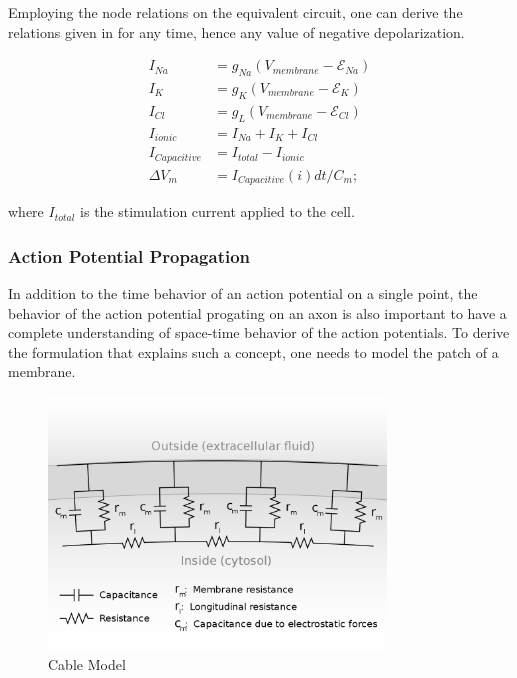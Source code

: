\documentclass{IEEEtran}
\begin{document}
Employing the node relations on the equivalent circuit, one can derive the relations given in  for any time, hence any value of negative depolarization.

\begin{align}
    I_{Na} &= g_{Na}(V_{membrane} - \mathcal{E}_{Na}) \label{eqn:node1}\\
    I_{K} &= g_{K}(V_{membrane} - \mathcal{E}_{K}) \label{eqn:node2}\\
    I_{Cl} &= g_{L}(V_{membrane} - \mathcal{E}_{Cl}) \label{eqn:node3}\\
    I_{ionic} &= I_{Na} + I_{K} + I_{Cl} \label{eqn:kirch1}\\
    I_{Capacitive} &= I_{total} - I_{ionic} \label{eqn:kirch2}\\
    \Delta V_m &= I_{Capacitive}(i)dt / C_m; \label{eqn:cap}
\end{align}

where $I_{total}$ is the stimulation current applied to the cell. 

\subsubsection{Action Potential Propagation}

In addition to the time behavior of an action potential on a single point, the behavior of the action potential  progating on an axon is also important to have a complete understanding of space-time behavior of the action potentials. To derive the formulation that explains such a concept, one needs to model the patch of a membrane.

\begin{figure}[h]
\centering
\includegraphics[width=0.8\textwidth]{1200px-Cable_theory_Neuron_RC_circuit_v3.svg.png}
\caption{Cable Model \cite{CableTheory}}\label{fig:approp}
\end{figure}
\end{document}
